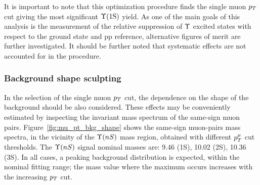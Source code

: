 It is important to note that this optimization procedure finds the single muon $p_T$ cut giving the most significant $\Upsilon\text{(1S)}$ yield. As one of the main goals of this analysis is the measurement of the relative suppression of $\Upsilon$ excited states with respect to the ground state and pp reference, alternative figures of merit are further investigated. It should be further noted that systematic effects are not accounted for in the procedure.  


\subsubsection{Background shape sculpting}

In the selection of the single muon $p_T$ cut, the dependence on the shape of the background should be also considered. 
These effects may be conveniently estimated by inspecting the invariant mass spectrum of the same-sign muon pairs. 
Figure~\ref{fig:mu_pt_bkg_shape} shows the same-sign muon-pairs mass spectra, in the vicinity of the $\Upsilon(nS)$ mass region, obtained with different $p_T^\mu$ cut thresholds. The $\Upsilon(nS)$ signal nominal masses are: 9.46 \GeVcc (1S), 10.02 \GeVcc (2S), 10.36 \GeVcc (3S).  
In all cases, a peaking background distribution is expected, within the nominal fitting range; the mass value where the maximum occurs increases with the increasing $p_T$ cut.
%
